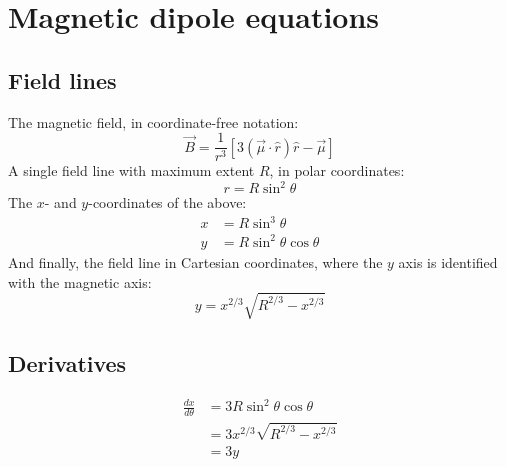 \documentclass[twocolumn]{article}
\newcommand{\deriv}[2]{\frac{d{#1}}{d{#2}}}
\begin{document}
\tableofcontents

\section{Magnetic dipole equations}

\subsection{Field lines}

The magnetic field, in coordinate-free notation:
\begin{equation}
    \vec{B} = \frac{1}{r^3}\left[3(\vec{\mu}\cdot\hat{r})\hat{r} - \vec{\mu}\right]
\end{equation}
A single field line with maximum extent $R$, in polar coordinates:
\begin{equation}
    r = R\sin^2\theta
\end{equation}
The $x$- and $y$-coordinates of the above:
\begin{align}
    x &= R\sin^3\theta \\
    y &= R\sin^2\theta\cos\theta
\end{align}
And finally, the field line in Cartesian coordinates, where the $y$ axis is identified with the magnetic axis:
\begin{equation}
    y = x^{2/3} \sqrt{R^{2/3} - x^{2/3}}
\end{equation}

\subsection{Derivatives}

\begin{equation}
    \begin{aligned}
        \deriv{x}{\theta} &= 3R\sin^2\theta\cos\theta \\
          &= 3x^{2/3} \sqrt{R^{2/3} - x^{2/3}} \\
          &= 3y
    \end{aligned}
\end{equation}
\end{document}
